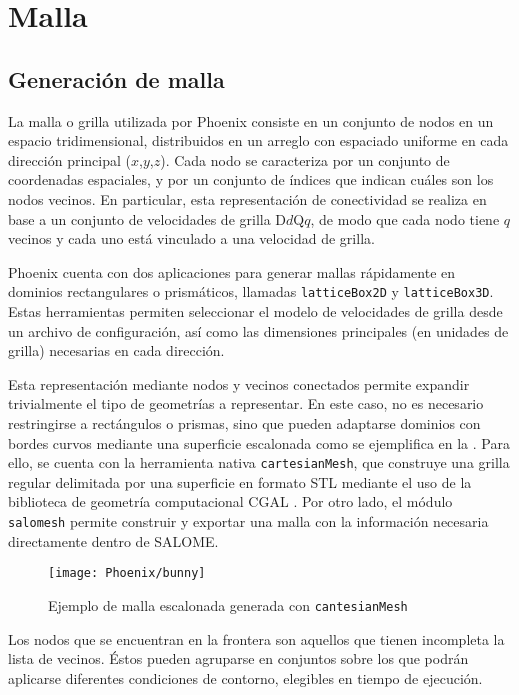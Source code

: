 \section{Malla}

\subsection{Generaci\'on de malla}

La malla o grilla utilizada por Phoenix consiste en un conjunto de nodos en un espacio tridimensional, distribuidos en un arreglo con espaciado uniforme en cada direcci\'on principal ($x$,$y$,$z$). Cada nodo se caracteriza por un conjunto de coordenadas espaciales, y por un conjunto de \'indices que indican cu\'ales son los nodos vecinos. En particular, esta representaci\'on de conectividad se realiza en base a un conjunto de velocidades de grilla D$d$Q$q$, de modo que cada nodo tiene $q$ vecinos y cada uno est\'a vinculado a una velocidad de grilla.

Phoenix cuenta con dos aplicaciones para generar mallas r\'apidamente en dominios rectangulares o prism\'aticos, llamadas \texttt{latticeBox2D} y \texttt{latticeBox3D}. Estas herramientas permiten seleccionar el modelo de velocidades de grilla desde un archivo de configuraci\'on, as\'i como las dimensiones principales (en unidades de grilla) necesarias en cada direcci\'on.

Esta representaci\'on mediante nodos y vecinos conectados permite expandir trivialmente el tipo de geometr\'ias a representar. En este caso, no es necesario restringirse a rect\'angulos o prismas, sino que pueden adaptarse dominios con bordes curvos mediante una superficie escalonada como se ejemplifica en la . Para ello, se cuenta con la herramienta nativa \texttt{cartesianMesh}, que construye una grilla regular delimitada por una superficie en formato STL mediante el uso de la biblioteca de geometr\'ia computacional CGAL \cite{noauthor_cgal_nodate}. Por otro lado, el m\'odulo \texttt{salomesh} permite construir y exportar una malla con la informaci\'on necesaria directamente dentro de SALOME.

\begin{figure}[ht]
	\centering
	\texttt{[image: Phoenix/bunny]}
	\caption{Ejemplo de malla escalonada generada con \texttt{cantesianMesh}}
	\label{fig:bunny}
\end{figure}

Los nodos que se encuentran en la frontera son aquellos que tienen incompleta la lista de vecinos. \'Estos pueden agruparse en conjuntos sobre los que podr\'an aplicarse diferentes condiciones de contorno, elegibles en tiempo de ejecuci\'on.


